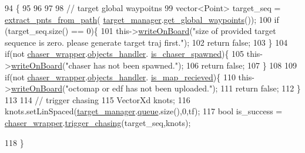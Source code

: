 \begin{DoxyCode}
94                                      \{
95     
96 
97 
98     \textcolor{comment}{// target global waypoitns  }
99     vector<Point> target\_seq = \hyperlink{_common_8h_a81915b091c29bc9aef6a74ab374f479a}{extract\_pnts\_from\_path}(
      \hyperlink{class_q_node_adc66765125dfd755d5e7f0c0eb6e6395}{target\_manager}.\hyperlink{class_target_manager_a747b82bf5cb4d1d3574dbc08a117538f}{get\_global\_waypoints}());
100     \textcolor{keywordflow}{if} (target\_seq.size() == 0)\{
101         this->\hyperlink{class_q_node_a80d139522a1333db2c6ea33914c32378}{writeOnBoard}(\textcolor{stringliteral}{"size of provided target sequence is zero. please generate target
       traj first."});
102         \textcolor{keywordflow}{return} \textcolor{keyword}{false};
103     \}
104     \textcolor{keywordflow}{if}(not \hyperlink{class_q_node_ad2d828488fb632a008c7d3ee0e1d1fa2}{chaser\_wrapper}.\hyperlink{class_wrapper_a8cddd5ffbaeb5ab0b5d8d8d0c74f810f}{objects\_handler}.
      \hyperlink{class_objects_handler_a16165ae7c0167ba8d2a0151a8a4fbfd5}{is\_chaser\_spawned})\{
105         this->\hyperlink{class_q_node_a80d139522a1333db2c6ea33914c32378}{writeOnBoard}(\textcolor{stringliteral}{"chaser has not been spawned."});
106         \textcolor{keywordflow}{return} \textcolor{keyword}{false};
107     \}
108 
109     \textcolor{keywordflow}{if}(not \hyperlink{class_q_node_ad2d828488fb632a008c7d3ee0e1d1fa2}{chaser\_wrapper}.\hyperlink{class_wrapper_a8cddd5ffbaeb5ab0b5d8d8d0c74f810f}{objects\_handler}.
      \hyperlink{class_objects_handler_acf1ef1b318defc2a39d87cea72689478}{is\_map\_recieved})\{
110         this->\hyperlink{class_q_node_a80d139522a1333db2c6ea33914c32378}{writeOnBoard}(\textcolor{stringliteral}{"octomap or edf has not been uploaded."});
111         \textcolor{keywordflow}{return} \textcolor{keyword}{false};
112     \}    
113 
114     \textcolor{comment}{// trigger chasing}
115     VectorXd knots;    
116     knots.setLinSpaced(\hyperlink{class_q_node_adc66765125dfd755d5e7f0c0eb6e6395}{target\_manager}.\hyperlink{class_target_manager_a0bbcb1981504e3bc587c3a98f41a91e9}{queue}.size(),0,tf); 
117     \textcolor{keywordtype}{bool} is\_success =  \hyperlink{class_q_node_ad2d828488fb632a008c7d3ee0e1d1fa2}{chaser\_wrapper}.\hyperlink{class_wrapper_a21a0e115ea80e053e4f2defd1362b92f}{trigger\_chasing}(target\_seq,knots);      
        
118 \}
\end{DoxyCode}
